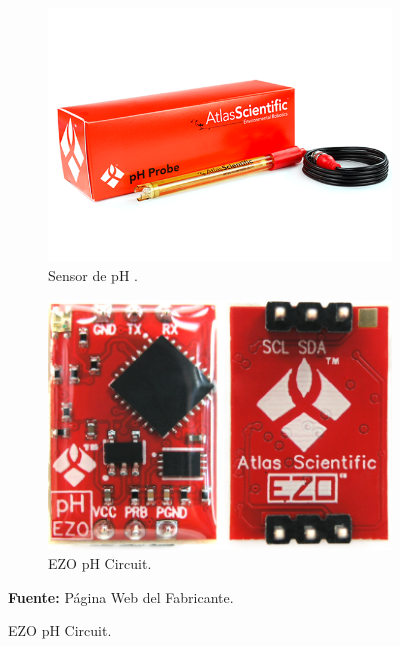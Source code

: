 \begin{figure}[H]
\caption[Sensor y EZO de pH.]{Sensor y EZO de pH de la empresa Atlas Scientific. }
     \centering
     \begin{subfigure}[b]{0.6\textwidth}
         \centering
         \includegraphics[width=\textwidth]{Imagenes/2021/imag23.png}
	    \caption[Sensor de pH.]{Sensor de pH . }
        \label{fig:sensorpH}
     \end{subfigure}
     \hfill
     \begin{subfigure}[b]{0.35\textwidth}
         \centering
         \includegraphics[width=\textwidth]{Imagenes/2021/imag27.png}
         \caption[EZO pH Circuit]{EZO pH Circuit.}
        \label{fig:EZOpH}
     \end{subfigure}
     {\textbf{Fuente:} P\'agina Web del Fabricante\cite{atlasph}.}
     \hfill
\end{figure}

